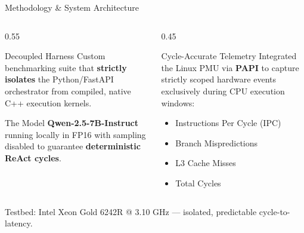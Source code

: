 \documentclass[aspectratio=169, 10pt]{beamer}
\begin{document}
\begin{frame}{Methodology \& System Architecture}
  \begin{columns}
    \begin{column}{0.55\textwidth}
      \begin{block}{Decoupled Harness}
        Custom benchmarking suite that \textbf{strictly isolates} the Python/FastAPI orchestrator from compiled, native C++ execution kernels.
      \end{block}
      \vspace{0.3em}
      \begin{block}{The Model}
        \textbf{Qwen-2.5-7B-Instruct} running locally in FP16 with sampling disabled to guarantee \textbf{deterministic ReAct cycles}.
      \end{block}
    \end{column}
    \begin{column}{0.45\textwidth}
      \begin{block}{Cycle-Accurate Telemetry}
        Integrated the Linux PMU via \textbf{PAPI} to capture strictly scoped hardware events exclusively during CPU execution windows:
        \begin{itemize}
          \item Instructions Per Cycle (IPC)
          \item Branch Mispredictions
          \item L3 Cache Misses
          \item Total Cycles
        \end{itemize}
      \end{block}
    \end{column}
  \end{columns}
  \vspace{0.4em}
  \begin{center}
    \textcolor{mist}{\small Testbed: Intel Xeon Gold 6242R @ 3.10 GHz --- isolated, predictable cycle-to-latency.}
  \end{center}
\end{frame}
\end{document}
